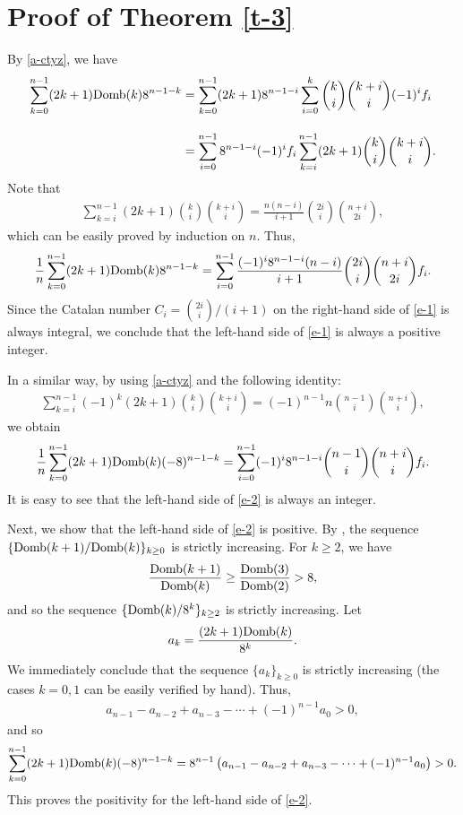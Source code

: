 \documentclass[12pt]{article}
\numberwithin{equation}{section}
\begin{document}
\section{Proof of Theorem \ref{t-3}}
By \eqref{a-ctyz}, we have
\begin{align*}
\sum_{k=0}^{n-1}(2k+1){\rm Domb}(k)8^{n-1-k}
&=\sum_{k=0}^{n-1}(2k+1)8^{n-1-i}
\sum_{i=0}^k{k\choose i}{k+i\choose i}(-1)^if_i\\[10pt]
&=\sum_{i=0}^{n-1}8^{n-1-i}(-1)^if_i\sum_{k=i}^{n-1}(2k+1)
{k\choose i}{k+i\choose i}.
\end{align*}
Note that
\begin{align*}
\sum_{k=i}^{n-1}(2k+1){k\choose i}{k+i\choose i}
=\frac{n(n-i)}{i+1}{2i\choose i}{n+i\choose 2i},
\end{align*}
which can be easily proved by induction on $n$. Thus,
\begin{align}
\frac{1}{n}\sum_{k=0}^{n-1}(2k+1){\rm Domb}(k)8^{n-1-k}
=\sum_{i=0}^{n-1}\frac{(-1)^i8^{n-1-i}(n-i)}{i+1}{2i\choose i}{n+i\choose 2i}f_i.
\label{e-1}
\end{align}
Since the Catalan number $C_i={2i\choose i}/(i+1)$ on the right-hand side of \eqref{e-1} is always integral, we conclude that the left-hand side of \eqref{e-1} is always a positive integer.

In a similar way, by using \eqref{a-ctyz} and the following identity:
\begin{align*}
\sum_{k=i}^{n-1}(-1)^k(2k+1){k\choose i}{k+i\choose i}
=(-1)^{n-1}n{n-1\choose i}{n+i\choose i},
\end{align*}
we obtain
\begin{align}
\frac{1}{n}\sum_{k=0}^{n-1}(2k+1){\rm Domb}(k)(-8)^{n-1-k}
=\sum_{i=0}^{n-1}(-1)^i8^{n-1-i}{n-1\choose i}{n+i\choose i}f_i.\label{e-2}
\end{align}
It is easy to see that the left-hand side of \eqref{e-2} is always an integer.

Next, we show that the left-hand side of \eqref{e-2} is positive.
By \cite[Proposition 2.8]{wz-scm-2014}, the sequence $\{{\rm Domb}(k+1)/{\rm Domb}(k)\}_{k\ge 0}$
is strictly increasing. For $k\ge 2$, we have
\begin{align*}
\frac{{\rm Domb}(k+1)}{{\rm Domb}(k)}\ge \frac{{\rm Domb}(3)}{{\rm Domb}(2)}>8,
\end{align*}
and so the sequence $\{{\rm Domb}(k)/8^k\}_{k\ge 2}$ is strictly increasing. Let
\begin{align*}
a_k=\frac{(2k+1){\rm Domb}(k)}{8^k}.
\end{align*}
We immediately conclude that the sequence $\{a_k\}_{k\ge 0}$ is strictly increasing (the cases $k=0,1$ can be easily verified by hand).
Thus,
\begin{align*}
a_{n-1}-a_{n-2}+a_{n-3}-\cdots+(-1)^{n-1}a_0>0,
\end{align*}
and so
\begin{align*}
\sum_{k=0}^{n-1}(2k+1){\rm Domb}(k)(-8)^{n-1-k}=
8^{n-1}\left(a_{n-1}-a_{n-2}+a_{n-3}-\cdots+(-1)^{n-1}a_0\right)>0.
\end{align*}
This proves the positivity for the left-hand side of \eqref{e-2}.
\end{document}
